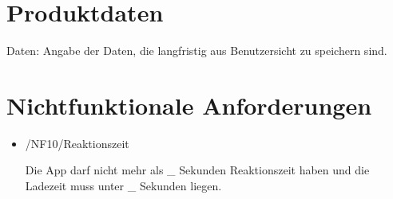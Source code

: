 \documentclass[a4paper]{scrreprt}
\begin{document}
    \chapter{Produktdaten}
        Daten: Angabe der Daten, die langfristig aus Benutzersicht zu speichern sind.
 
   \chapter{Nichtfunktionale Anforderungen}
        \begin{itemize}
            \item /NF10/Reaktionszeit

            	\par Die App darf nicht mehr als \_ Sekunden Reaktionszeit haben und die Ladezeit muss unter \_ Sekunden liegen.

                
        \end{itemize}
 
\end{document}
